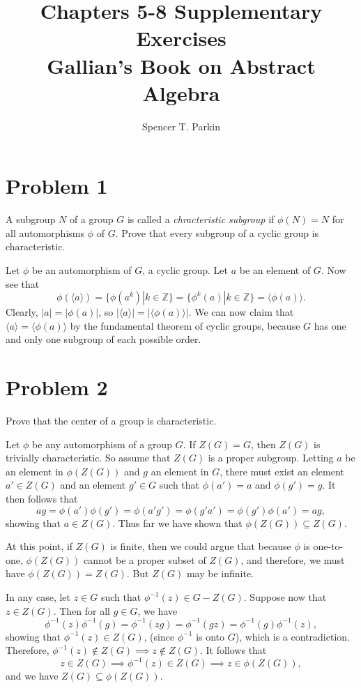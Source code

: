 \documentclass[12pt]{article}
\title{Chapters 5-8 Supplementary Exercises\\Gallian's Book on Abstract Algebra}
\author{Spencer T. Parkin}
\newcommand{\Z}{\mathbb{Z}}
\begin{document}
\maketitle

\section*{Problem 1}

A subgroup $N$ of a group $G$ is called a {\it chracteristic subgroup} if $\phi(N)=N$
for all automorphisms $\phi$ of $G$.  Prove that every subgroup of a cyclic group is characteristic.

Let $\phi$ be an automorphism of $G$, a cyclic group.
Let $a$ be an element of $G$.  Now see that
\begin{equation*}
\phi(\langle a\rangle)=\{\phi(a^k)|k\in\Z\}=\{\phi^k(a)|k\in\Z\}=\langle\phi(a)\rangle.
\end{equation*}
Clearly, $|a|=|\phi(a)|$, so $|\langle a\rangle|=|\langle\phi(a)\rangle|$.  We can
now claim that $\langle a\rangle=\langle \phi(a)\rangle$ by the fundamental
theorem of cyclic groups, because $G$ has one and only one subgroup of each
possible order.

\pagebreak
\section*{Problem 2}

Prove that the center of a group is characteristic.

Let $\phi$ be any automorphism of a group $G$.
If $Z(G)=G$, then $Z(G)$ is trivially characteristic.
So assume that $Z(G)$ is a proper subgroup.
Letting $a$ be an element in $\phi(Z(G))$ and $g$ an element in $G$,
there must exist an element $a'\in Z(G)$ and an element $g'\in G$ such
that $\phi(a')=a$ and $\phi(g')=g$.  It then follows that
\begin{equation*}
ag=\phi(a')\phi(g')=\phi(a'g')=\phi(g'a')=\phi(g')\phi(a')=ag,
\end{equation*}
showing that $a\in Z(G)$.
Thus far we have shown that $\phi(Z(G))\subseteq Z(G)$.

At this point, if $Z(G)$ is finite, then we could argue that
because $\phi$ is one-to-one, $\phi(Z(G))$ cannot be a proper
subset of $Z(G)$, and therefore, we must have $\phi(Z(G))=Z(G)$.
But $Z(G)$ may be infinite.

In any case, let $z\in G$ such that $\phi^{-1}(z)\in G-Z(G)$.
Suppose now that $z\in Z(G)$.  Then for all $g\in G$, we have
\begin{equation*}
\phi^{-1}(z)\phi^{-1}(g)=\phi^{-1}(zg)=\phi^{-1}(gz)=\phi^{-1}(g)\phi^{-1}(z),
\end{equation*}
showing that $\phi^{-1}(z)\in Z(G)$, (since $\phi^{-1}$ is onto $G$), which is a contradiction.
Therefore, $\phi^{-1}(z)\not\in Z(G)\implies z\not\in Z(G)$.
It follows that
\begin{equation*}
z\in Z(G)\implies\phi^{-1}(z)\in Z(G)\implies z\in \phi(Z(G)),
\end{equation*}
and we have $Z(G)\subseteq\phi(Z(G))$.
\end{document}
